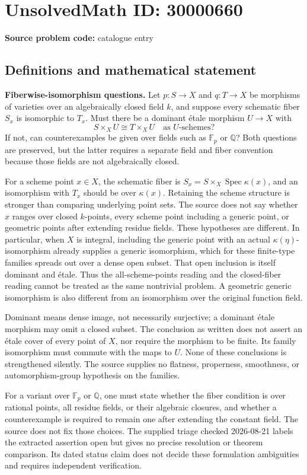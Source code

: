 \documentclass[11pt]{article}
\newcommand{\Q}{\mathbb{Q}}
\newcommand{\F}{\mathbb{F}}
\begin{document}
\section*{UnsolvedMath ID: 30000660}
\textbf{Source problem code:} catalogue entry
\subsection{Definitions and mathematical statement}
\textbf{Fiberwise-isomorphism questions.} Let \(p:S\to X\) and \(q:T\to X\) be morphisms of varieties over an algebraically closed field \(k\), and suppose every schematic fiber \(S_x\) is isomorphic to \(T_x\). Must there be a dominant \'etale morphism \(U\to X\) with\[S\times_XU\cong T\times_XU\quad\text{as }U\text{-schemes}?\] If not, can counterexamples be given over fields such as \(\F_p\) or \(\Q\)? Both questions are preserved, but the latter requires a separate field and fiber convention because those fields are not algebraically closed.\par For a scheme point \(x\in X\), the schematic fiber is \(S_x=S\times_X\operatorname{Spec}\kappa(x)\), and an isomorphism with \(T_x\) should be over \(\kappa(x)\). Retaining the scheme structure is stronger than comparing underlying point sets. The source does not say whether \(x\) ranges over closed \(k\)-points, every scheme point including a generic point, or geometric points after extending residue fields. These hypotheses are different. In particular, when \(X\) is integral, including the generic point with an actual \(\kappa(\eta)\)-isomorphism already supplies a generic isomorphism, which for these finite-type families spreads out over a dense open subset. That open inclusion is itself dominant and \'etale. Thus the all-scheme-points reading and the closed-fiber reading cannot be treated as the same nontrivial problem. A geometric generic isomorphism is also different from an isomorphism over the original function field.\par Dominant means dense image, not necessarily surjective; a dominant \'etale morphism may omit a closed subset. The conclusion as written does not assert an \'etale cover of every point of \(X\), nor require the morphism to be finite. Its family isomorphism must commute with the maps to \(U\). None of these conclusions is strengthened silently. The source supplies no flatness, properness, smoothness, or automorphism-group hypothesis on the families.\par For a variant over \(\F_p\) or \(\Q\), one must state whether the fiber condition is over rational points, all residue fields, or their algebraic closures, and whether a counterexample is required to remain one after extending the constant field. The source does not fix those choices. The supplied triage checked 2026-08-21 labels the extracted assertion open but gives no precise resolution or theorem comparison. Its dated status claim does not decide these formulation ambiguities and requires independent verification.
\end{document}
